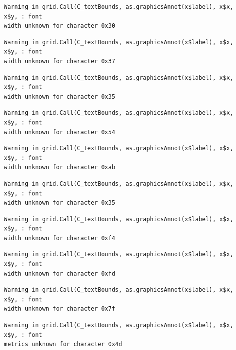 \documentclass[
  letterpaper,
  DIV=11,
  numbers=noendperiod]{scrreprt}
\begin{document}
\begin{verbatim}
Warning in grid.Call(C_textBounds, as.graphicsAnnot(x$label), x$x, x$y, : font
width unknown for character 0x30
\end{verbatim}

\begin{verbatim}
Warning in grid.Call(C_textBounds, as.graphicsAnnot(x$label), x$x, x$y, : font
width unknown for character 0x37
\end{verbatim}

\begin{verbatim}
Warning in grid.Call(C_textBounds, as.graphicsAnnot(x$label), x$x, x$y, : font
width unknown for character 0x35
\end{verbatim}

\begin{verbatim}
Warning in grid.Call(C_textBounds, as.graphicsAnnot(x$label), x$x, x$y, : font
width unknown for character 0x54
\end{verbatim}

\begin{verbatim}
Warning in grid.Call(C_textBounds, as.graphicsAnnot(x$label), x$x, x$y, : font
width unknown for character 0xab
\end{verbatim}

\begin{verbatim}
Warning in grid.Call(C_textBounds, as.graphicsAnnot(x$label), x$x, x$y, : font
width unknown for character 0x35
\end{verbatim}

\begin{verbatim}
Warning in grid.Call(C_textBounds, as.graphicsAnnot(x$label), x$x, x$y, : font
width unknown for character 0xf4
\end{verbatim}

\begin{verbatim}
Warning in grid.Call(C_textBounds, as.graphicsAnnot(x$label), x$x, x$y, : font
width unknown for character 0xfd
\end{verbatim}

\begin{verbatim}
Warning in grid.Call(C_textBounds, as.graphicsAnnot(x$label), x$x, x$y, : font
width unknown for character 0x7f
\end{verbatim}

\begin{verbatim}
Warning in grid.Call(C_textBounds, as.graphicsAnnot(x$label), x$x, x$y, : font
metrics unknown for character 0x4d
\end{verbatim}
\end{document}
